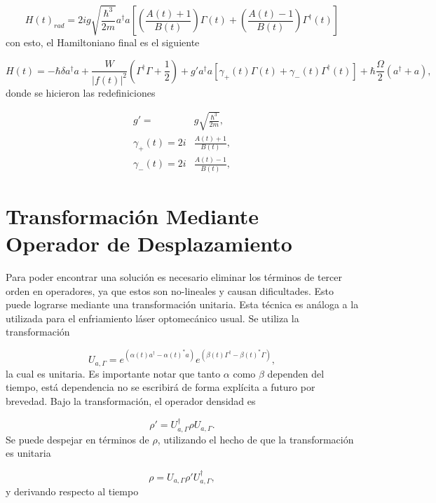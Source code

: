 \documentclass[10pt,a4paper]{report}
\begin{document}
\begin{equation}
H(t)_{rad} = 2ig\sqrt{\frac{\hbar^3}{2m}}  a^\dagger a[(\frac{A(t) +1}{B(t)})\Gamma (t) +(\frac{A(t) -1}{B(t)})\Gamma^\dagger (t)]
\end{equation} con esto, el Hamiltoniano final es el siguiente

\begin{equation}\label{LaserCoolingHamiltonian}
H(t) = -\hbar \delta a^\dagger a + \frac{W}{|f(t)|^2}(\Gamma^\dagger \Gamma + \frac{1}{2}) +  g'a^\dagger a[\gamma_+(t)\Gamma (t) +\gamma_-(t)\Gamma^\dagger (t)] + \hbar\frac{\Omega}{2}(a^\dagger + a),
\end{equation} donde se hicieron las redefiniciones

\begin{align*}
g'=&g\sqrt{\frac{\hbar^3}{2m}},\\
\gamma_+(t)=2i&\frac{A(t) +1}{B(t)},\\
\gamma_-(t)=2i&\frac{A(t) -1}{B(t)},
\end{align*} 


\section{Transformación Mediante Operador de Desplazamiento}

Para poder encontrar una solución es necesario eliminar los términos de tercer orden en operadores, ya que estos son no-lineales y causan dificultades. Esto puede lograrse mediante una transformación unitaria. Esta técnica es análoga a la utilizada para el enfriamiento láser optomecánico usual. Se utiliza la transformación

\begin{equation}
U_{a,\Gamma} = e^{(\alpha(t) a^\dagger - \alpha(t)^*a)}e^{(\beta(t) \Gamma^\dagger - \beta(t)^*\Gamma)},
\end{equation}la cual es unitaria. Es importante notar que tanto $\alpha$ como $\beta$ dependen del tiempo, está dependencia no se escribirá de forma explícita a futuro por brevedad. Bajo la transformación, el operador densidad es

\begin{equation}
\rho' = U_{a,\Gamma}^\dagger \rho U_{a,\Gamma}.
\end{equation} Se puede despejar en términos de $\rho$, utilizando el hecho de que la transformación es unitaria

\begin{equation}
\rho = U_{a,\Gamma} \rho' U_{a,\Gamma}^\dagger,
\end{equation}y derivando respecto al tiempo
\end{document}
